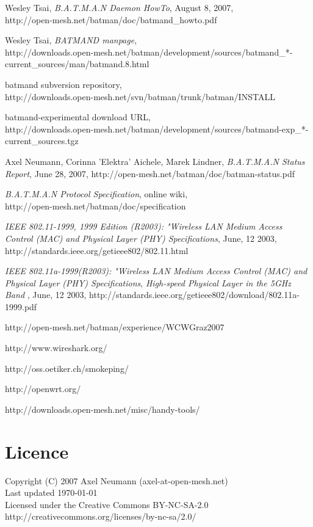 \documentclass[11pt]{article}
\begin{document}
\begin{thebibliography}{1}

{Wesley Tsai},
{\it B.A.T.M.A.N Daemon HowTo}, {August 8, 2007},\\
{http://open-mesh.net/batman/doc/batmand\_howto.pdf}

{Wesley Tsai},
{\it BATMAND manpage},\\
{http://downloads.open-mesh.net/batman/development/sources/batmand\_*-current\_sources/man/batmand.8.html}

{batmand subversion repository},\\
{http://downloads.open-mesh.net/svn/batman/trunk/batman/INSTALL}

{batmand-experimental download URL},\\
{http://downloads.open-mesh.net/batman/development/sources/batmand-exp\_*-current\_sources.tgz}


{Axel Neumann, Corinna 'Elektra' Aichele, Marek Lindner},
{\it B.A.T.M.A.N Status Report}, {June 28, 2007},
{http://open-mesh.net/batman/doc/batman-status.pdf}

{\it B.A.T.M.A.N Protocol Specification}, {online wiki},\\
{http://open-mesh.net/batman/doc/specification}


	{\it IEEE 802.11-1999, 1999 Edition (R2003): "Wireless LAN Medium
	Access Control (MAC) and Physical Layer (PHY) Specifications},
  {June, 12 2003},
	http://standards.ieee.org/getieee802/802.11.html

	{\it IEEE 802.11a-1999(R2003): "Wireless LAN Medium Access Control (MAC) and Physical Layer (PHY) Specifications},
	{\it High-speed Physical Layer in the 5GHz Band },
  {June, 12 2003},
	http://standards.ieee.org/getieee802/download/802.11a-1999.pdf

 http://open-mesh.net/batman/experience/WCWGraz2007

 http://www.wireshark.org/

 http://oss.oetiker.ch/smokeping/

 http://openwrt.org/

 http://downloads.open-mesh.net/misc/handy-tools/

\end{thebibliography}

\section*{Licence}

Copyright (C) 2007 Axel Neumann (axel-at-open-mesh.net) \\
Last updated \today\\
Licensed under the Creative Commons BY-NC-SA-2.0 \\
http://creativecommons.org/licenses/by-nc-sa/2.0/
\end{document}
